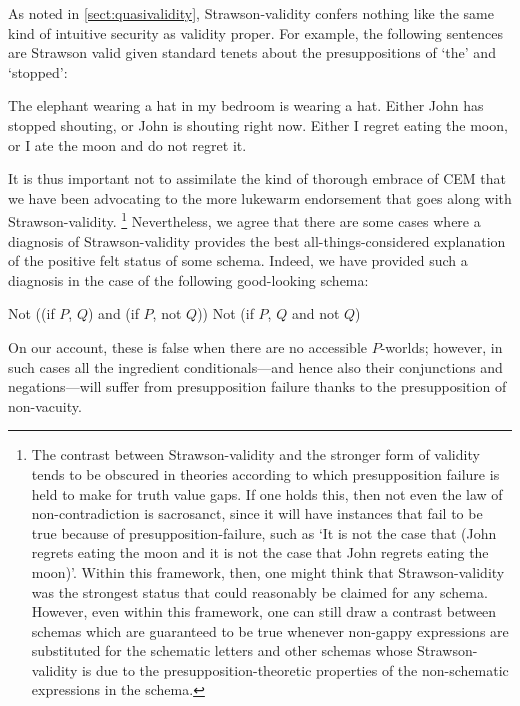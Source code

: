 \documentclass[If.tex]{subfiles}
\begin{document}
As noted in \autoref{sect:quasivalidity}, Strawson-validity confers nothing like the same kind of intuitive security as validity proper.  For example, the following sentences are Strawson valid given standard tenets about the presuppositions of ‘the’ and ‘stopped’:
\begin{prop}
	\nitem
	\begin{prop}
		\aitem
		The elephant wearing a hat in my bedroom is wearing a hat.
		\aitem
		Either John has stopped shouting, or John is shouting right now.
		\aitem
		Either I regret eating the moon, or I ate the moon and do not regret it.  
	\end{prop}
\end{prop}
It is thus important not to assimilate the kind of thorough embrace of CEM that we have been advocating to the more lukewarm endorsement that goes along with Strawson-validity.%
\footnote{The contrast between Strawson-validity and the stronger form of validity tends to be obscured in theories according to which presupposition failure is held to make for truth value gaps.  If one holds this, then not even the law of non-contradiction is sacrosanct, since it will have instances that fail to be true because of presupposition-failure, such as ‘It is not the case that (John regrets eating the moon and it is not the case that John regrets eating the moon)’.  Within this framework, then, one might think that Strawson-validity was the strongest status that could reasonably be claimed for any schema.  However, even within this framework, one can still draw a contrast between schemas which are guaranteed to be true whenever non-gappy expressions are substituted for the schematic letters and other schemas whose Strawson-validity is due to the presupposition-theoretic properties of the non-schematic expressions in the schema.}
Nevertheless, we agree that there are some cases where a diagnosis of Strawson-validity provides the best all-things-considered explanation of the positive felt status of some schema.  Indeed, we have provided such a diagnosis in the case of the following good-looking schema:
\begin{prop}
	\litem[CNC]
	Not ((if $P$, $Q$) and (if $P$, not $Q$))
	\litem[CNC*]
	Not (if $P$, $Q$ and not $Q$)
\end{prop}
On our account, these is false when there are no accessible $P$-worlds; however, in such cases all the ingredient conditionals---and hence also their conjunctions and negations---will suffer from presupposition failure thanks to the presupposition of non-vacuity.%
\end{document}
